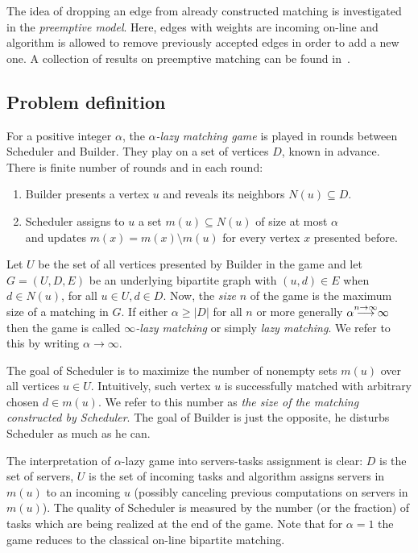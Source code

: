 \documentclass[12pt]{amsart}
\renewcommand{\geq}{\geqslant}
\theoremstyle{definition}
\newcommand{\abs}[1]{\left\vert#1\right\vert}
\newcommand{\Br}{Builder\xspace}
\newcommand{\Sr}{Scheduler\xspace}
\begin{document}
The idea of dropping an edge from already constructed matching
is investigated in the \emph{preemptive model}. 
Here, edges with weights are incoming on-line and algorithm is allowed to remove previously accepted edges in order to add a new one.
A collection of results on preemptive matching can be found in~\cite{CTV2015,ELSW2013}.


\subsection{Problem definition}\label{sec:definition}


For a positive integer $\alpha$, the \emph{$\alpha$-lazy matching game} is played in rounds between \Sr and \Br. 
They play on a set of vertices $D$, known in advance.
There is finite number of rounds and in each round:
\begin{enumerate}
	\item \Br presents a vertex $u$ and reveals its neighbors $N(u)\subseteq D$.
	\item \Sr assigns to $u$ a set $m(u)\subseteq N(u)$ of size at most $\alpha$ \label{game:2}\\
	  and updates $m(x)=m(x)\setminus m(u)$ for every vertex $x$ presented before.
\end{enumerate}
Let $U$ be the set of all vertices presented by \Br in the game and let $G=(U,D,E)$ be an underlying bipartite graph with $(u,d)\in E$ when $d\in N(u)$, for all $u\in U, d\in D$.
Now, the \emph{size} $n$ of the game is the maximum size of a matching in $G$.
{If either $\alpha\geq \abs{D}$ for all $n$ or more generally $\alpha{\buildrel n\to\infty\over\longrightarrow}\infty$ then the game is called \emph{$\infty$-lazy matching} or simply \emph{lazy matching}.} We refer to this by writing $\alpha\to\infty$.

The goal of \Sr is to maximize the number of nonempty sets $m(u)$ over all vertices $u\in U$. 
Intuitively, such vertex $u$ is successfully matched with arbitrary chosen $d\in m(u)$. 
We  refer to this number as \emph{the size of the matching constructed by Scheduler}.
The goal of \Br is just the opposite, he disturbs \Sr as much as he can.

The interpretation of $\alpha$-lazy game into servers-tasks assignment is clear: $D$ is the set of servers, $U$ is the set of incoming tasks
and algorithm assigns servers in $m(u)$ to an incoming $u$ (possibly canceling previous computations on servers in $m(u)$).
The quality of Scheduler is measured by the number (or the fraction) of tasks which are being realized at the end of the game. 
Note that for $\alpha=1$ the game reduces to the classical on-line bipartite matching.
\end{document}
